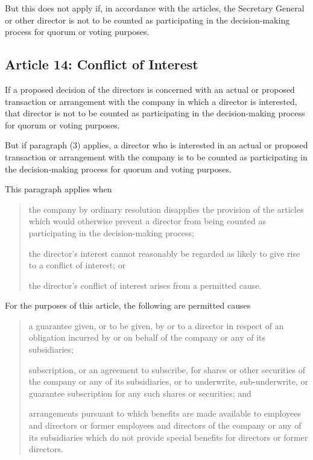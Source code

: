 \documentclass[letterpaper,10pt,openany,oneside,english]{sphinxmanual}
\begin{document}
 But this does not apply if, in accordance with the articles, the Secretary General or other director is not to be counted as participating in the decision-making process for quorum or voting purposes.


\subsection{Article 14: Conflict of Interest}
\label{\detokenize{directors:article-14-conflict-of-interest}}\label{\detokenize{directors:article-14}}
 If a proposed decision of the directors is concerned with an actual or proposed transaction or arrangement with the company in which a director is interested, that director is not to be counted as participating in the decision-making process for quorum or voting purposes.

 But if paragraph (3) applies, a director who is interested in an actual or proposed transaction or arrangement with the company is to be counted as participating in the decision-making process for quorum and voting purposes.

 This paragraph applies when
\begin{quote}

 the company by ordinary resolution disapplies the provision of the articles which would otherwise prevent a director from being counted as participating in the decision-making process;

 the director’s interest cannot reasonably be regarded as likely to give rise to a conflict of interest; or

 the director’s conflict of interest arises from a permitted cause.
\end{quote}

 For the purposes of this article, the following are permitted causes
\begin{quote}

 a guarantee given, or to be given, by or to a director in respect of an obligation incurred by or on behalf of the company or any of its subsidiaries;

 subscription, or an agreement to subscribe, for shares or other securities of the company or any of its subsidiaries, or to underwrite, sub-underwrite, or guarantee subscription for any such shares or securities; and

 arrangements pursuant to which benefits are made available to employees and directors or former employees and directors of the company or any of its subsidiaries which do not provide special benefits for directors or former directors.
\end{quote}
\end{document}
